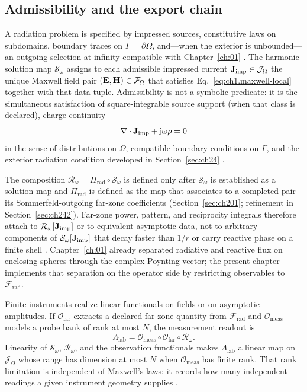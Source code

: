 \subsection{Admissibility and the export chain}
\label{sec:ch203}

A radiation problem is specified by impressed sources, constitutive laws on subdomains, boundary traces on $\Gamma=\partial\Omega$, and---when the exterior is unbounded---an outgoing selection at infinity compatible with Chapter~\ref{ch:01} \cite{stratton1941,maxwell1873}. The harmonic solution map $\mathcal{S}_\omega$ assigns to each admissible impressed current $\mathbf{J}_{\mathrm{imp}}\in\mathcal{J}_\Omega$ the unique Maxwell field pair $(\mathbf{E},\mathbf{H})\in\mathcal{F}_\Omega$ that satisfies Eq.~\eqref{eq:ch1.maxwell-local} together with that data tuple. Admissibility is not a symbolic predicate: it is the simultaneous satisfaction of square-integrable source support (when that class is declared), charge continuity
\begin{equation}
\label{eq:ch2.charge-continuity-admissibility}
\nabla\cdot\mathbf{J}_{\mathrm{imp}}+\mathrm{j}\omega\rho=0
\end{equation}
in the sense of distributions on $\Omega$, compatible boundary conditions on $\Gamma$, and the exterior radiation condition developed in Section~\ref{sec:ch24} \cite{stratton1941}.

The composition $\mathcal{R}_\omega=\Pi_{\mathrm{rad}}\circ\mathcal{S}_\omega$ is defined only after $\mathcal{S}_\omega$ is established as a solution map and $\Pi_{\mathrm{rad}}$ is defined as the map that associates to a completed pair its Sommerfeld-outgoing far-zone coefficients (Section~\ref{sec:ch201}; refinement in Section~\ref{sec:ch242}). Far-zone power, pattern, and reciprocity integrals therefore attach to $\mathcal{R}_\omega[\mathbf{J}_{\mathrm{imp}}]$ or to equivalent asymptotic data, not to arbitrary components of $\mathcal{S}_\omega[\mathbf{J}_{\mathrm{imp}}]$ that decay faster than $1/r$ or carry reactive phase on a finite shell \cite{poynting1884,harrington2001}. Chapter~\ref{ch:01} already separated radiative and reactive flux on enclosing spheres through the complex Poynting vector; the present chapter implements that separation on the operator side by restricting observables to $\mathcal{F}_{\mathrm{rad}}$.

Finite instruments realize linear functionals on fields or on asymptotic amplitudes. If $\mathcal{O}_{\mathrm{far}}$ extracts a declared far-zone quantity from $\mathcal{F}_{\mathrm{rad}}$ and $\mathcal{O}_{\mathrm{meas}}$ models a probe bank of rank at most $N$, the measurement readout is
\begin{equation}
\label{eq:ch2.operational-measurement-chain}
\Lambda_{\mathrm{lab}}
=
\mathcal{O}_{\mathrm{meas}}\circ\mathcal{O}_{\mathrm{far}}\circ\mathcal{R}_\omega.
\end{equation}
Linearity of $\mathcal{S}_\omega$, $\mathcal{R}_\omega$, and the observation functionals makes $\Lambda_{\mathrm{lab}}$ a linear map on $\mathcal{J}_\Omega$ whose range has dimension at most $N$ when $\mathcal{O}_{\mathrm{meas}}$ has finite rank. That rank limitation is independent of Maxwell's laws: it records how many independent readings a given instrument geometry supplies \cite{hansen1988,stratton1941}.

